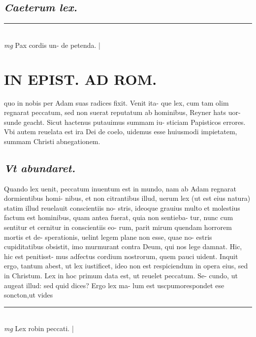 \documentclass{article}
\begin{document}
\begin{pages}
\subsection*{\textit{Caeterum lex. }}
\vspace{0.5cm}\noindent
\vspace{0.2cm}\rule{1cm}{0.2pt}\\ 
\hspace{0.2cm}\textit{mg}
\footnotesize Pax cordis un- de petenda.  
\normalsize| 
\section*{IN EPIST. AD ROM.  }
\marginpar{[ p.50 ]}\pstart quo in nobis per Adam suas radices fixit. Venit ita- que lex, cum tam olim regnarat peccatum, sed non suerat reputatum ab hominibus, Reyner hats uor- sunde geacht. Sicut hactenus putauimus summam iu- sticiam Papisticos errores. Vbi autem reuelata est ira Dei de coelo, uidemus esse huiusmodi impietatem, summam Christi abnegationem.   \pend
{}
{}
\subsection*{\textit{Vt abundaret. }}\pstart Quando lex uenit, peccatum inuentum est in mundo, nam ab Adam regnarat dormientibus homi- nibus, et non citrantibus illud, uerum lex (ut est eius natura) statim illud reuelauit conscientiis no- stris, ideoque grauius multo et molestius factum est hominibus, quam antea fuerat, quia non sentieba- tur, nunc cum sentitur et cernitur in conscientiis eo- rum, parit mirum quendam horrorem mortis et de- sperationis, uelint legem plane non esse, quae no- estris cupiditatibus obsistit, imo murmurant contra Deum, qui nos lege damnat. Hic, hic est penitisst- mus adfectus cordium nostrorum, quem pauci uident.  Inquit ergo, tantum abest, ut lex iustificet, ideo non est respiciendum in opera eius, sed in Christum.  Lex in hoc primum data est, ut reuelet peccatum. Se- cundo, ut augeat illud: sed quid dices? Ergo lex ma- lum est uscpumorespondet ese soncton,ut vides  \pend
\vspace{0.5cm}\noindent
\vspace{0.2cm}\rule{1cm}{0.2pt}\\ 
\hspace{0.2cm}\textit{mg}
\footnotesize Lex robin peccati.  
\normalsize| 

\end{pages}
\end{document}
